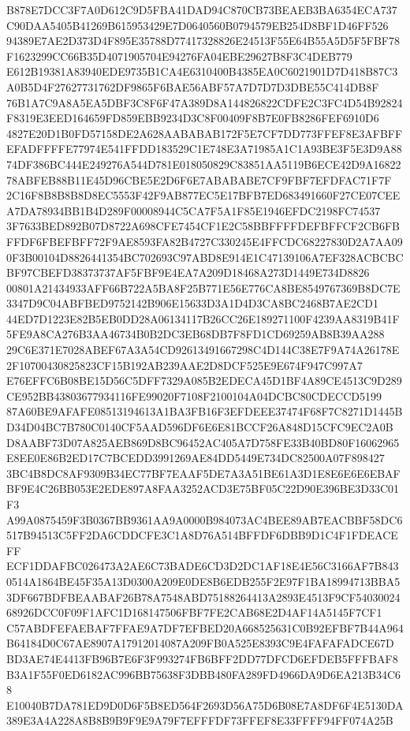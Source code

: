 \documentclass[UTF8,fontset=fandol,zihao=-4,a4paper]{ctexart}
\begin{document}
{{B878E7DCC3F7A0D612C9D5FBA41DAD94C870CB73BEAEB3BA6354ECA737C90DAA5405B41269B615953429E7D0640560B0794579EB254D8BF1D46FF526
94389E7AE2D373D4F895E35788D77417328826E24513F55E64B55A5D5F5FBF78F1623299CC66B35D4071905704E94276FA04EBE29627B8F3C4DEB779
E612B19381A83940EDE9735B1CA4E6310400B4385EA0C6021901D7D418B87C3A0B5D4F27627731762DF9865F6BAE56ABF57A7D7D7D3DBE55C414DB8F
76B1A7C9A8A5EA5DBF3C8F6F47A389D8A144826822CDFE2C3FC4D54B92824F8319E3EED164659FD859EBB9234D3C8F00409F8B7E0FB8286FEF6910D6
4827E20D1B0FD57158DE2A628AABABAB172F5E7CF7DD773FFEF8E3AFBFFEFADFFFFE77974E541FFDD183529C1E748E3A71985A1C1A93BE3F5E3D9A88
74DF386BC444E249276A544D781E018050829C83851AA5119B6ECE42D9A1682278ABFEB88B11E45D96CBE5E2D6F6E7ABABABE7CF9FBF7EFDFAC71F7F
2C16F8B8B8B8D8EC5553F42F9AB877EC5E17BFB7ED683491660F27CE07CEEA7DA78934BB1B4D289F00008944C5CA7F5A1F85E1946EFDC2198FC74537
3F7633BED892B07D8722A698CFE7454CF1E2C58BBFFFFDEFBFFCF2CB6FBFFDF6FBEFBFF72F9AE8593FA82B4727C330245E4FFCDC68227830D2A7AA09
0F3B00104D8826441354BC702693C97ABD8E914E1C47139106A7EF328ACBCBCBF97CBEFD38373737AF5FBF9E4EA7A209D18468A273D1449E734D8826
00801A21434933AFF66B722A5BA8F25B771E56E776CA8BE8549767369B8DC7E3347D9C04ABFBED9752142B906E15633D3A1D4D3CA8BC2468B7AE2CD1
44ED7D1223E82B5EB0DD28A06134117B26CC26E189271100F4239AA8319B41F5FE9A8CA276B3AA46734B0B2DC3EB68DB7F8FD1CD69259AB8B39AA288
29C6E371E7028ABEF67A3A54CD92613491667298C4D144C38E7F9A74A26178E2F10700430825823CF15B192AB239AAE2D8DCF525E9E674F947C997A7
E76EFFC6B08BE15D56C5DFF7329A085B2EDECA45D1BF4A89CE4513C9D289CE952BB43803677934116FE99020F7108F2100104A04DCBC80CDECCD5199
87A60BE9AFAFE08513194613A1BA3FB16F3EFDEEE37474F68F7C8271D1445BD34D04BC7B780C0140CF5AAD596DF6E6E81BCCF26A848D15CFC9EC2A0B
D8AABF73D07A825AEB869D8BC96452AC405A7D758FE33B40BD80F16062965E8EE0E86B2ED17C7BCEDD3991269AE84DD5449E734DC82500A07F898427
3BC4B8DC8AF9309B34EC77BF7EAAF5DE7A3A51BE61A3D1E8E6E6E6EBAFBF9E4C26BB053E2EDE897A8FAA3252ACD3E75BF05C22D90E396BE3D33C01F3
A99A0875459F3B0367BB9361AA9A0000B984073AC4BEE89AB7EACBBF58DC6517B94513C5FF2DA6CDDCFE3C1A8D76A514BFFDF6DBB9D1C4F1FDEACEFF
ECF1DDAFBC026473A2AE6C73BADE6CD3D2DC1AF18E4E56C3166AF7B8430514A1864BE45F35A13D0300A209E0DE8B6EDB255F2E97F1BA18994713BBA5
3DF667BDFBEAABAF26B78A7548ABD75188264413A2893E4513F9CF5403002468926DCC0F09F1AFC1D168147506FBF7FE2CAB68E2D4AF14A5145F7CF1
C57ABDFEFAEBAF7FFAE9A7DF7EFBED20A668525631C0B92EFBF7B44A964B64184D0C67AE8907A17912014087A209FB0A525E8393C9E4FAFAFADCE67D
BD3AE74E4413FB96B7E6F3F993274FB6BFF2DD77DFCD6EFDEB5FFFBAF8B3A1F55F0ED6182AC996BB75638F3DBB480FA289FD4966DA9D6EA213B34C68
E10040B7DA781ED9D0D6F5B8ED564F2693D56A75D6B08E7A8DF6F4E5130DA389E3A4A228A8B8B9B9F9E9A79F7EFFFDF73FFEF8E33FFFF94FF074A25B
}}
\end{document}
